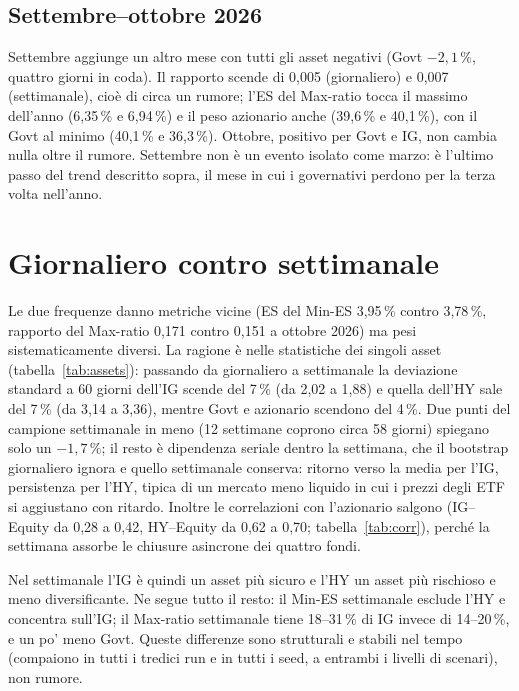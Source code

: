 \documentclass[11pt,a4paper]{article}
\begin{document}
\subsection{Settembre--ottobre 2026}

Settembre aggiunge un altro mese con tutti gli asset negativi (Govt $-2{,}1\,\%$, quattro giorni in coda). Il rapporto scende di 0,005 (giornaliero) e 0,007 (settimanale), cio\`e di circa un rumore; l'ES del Max-ratio tocca il massimo dell'anno (6,35\,\% e 6,94\,\%) e il peso azionario anche (39,6\,\% e 40,1\,\%), con il Govt al minimo (40,1\,\% e 36,3\,\%). Ottobre, positivo per Govt e IG, non cambia nulla oltre il rumore. Settembre non \`e un evento isolato come marzo: \`e l'ultimo passo del trend descritto sopra, il mese in cui i governativi perdono per la terza volta nell'anno.

\section{Giornaliero contro settimanale}

Le due frequenze danno metriche vicine (ES del Min-ES 3,95\,\% contro 3,78\,\%, rapporto del Max-ratio 0,171 contro 0,151 a ottobre 2026) ma pesi sistematicamente diversi. La ragione \`e nelle statistiche dei singoli asset (tabella~\ref{tab:assets}): passando da giornaliero a settimanale la deviazione standard a 60 giorni dell'IG scende del 7\,\% (da 2,02 a 1,88) e quella dell'HY sale del 7\,\% (da 3,14 a 3,36), mentre Govt e azionario scendono del 4\,\%. Due punti del campione settimanale in meno (12 settimane coprono circa 58 giorni) spiegano solo un $-1{,}7\,\%$; il resto \`e dipendenza seriale dentro la settimana, che il bootstrap giornaliero ignora e quello settimanale conserva: ritorno verso la media per l'IG, persistenza per l'HY, tipica di un mercato meno liquido in cui i prezzi degli ETF si aggiustano con ritardo. Inoltre le correlazioni con l'azionario salgono (IG--Equity da 0,28 a 0,42, HY--Equity da 0,62 a 0,70; tabella~\ref{tab:corr}), perch\'e la settimana assorbe le chiusure asincrone dei quattro fondi.

Nel settimanale l'IG \`e quindi un asset pi\`u sicuro e l'HY un asset pi\`u rischioso e meno diversificante. Ne segue tutto il resto: il Min-ES settimanale esclude l'HY e concentra sull'IG; il Max-ratio settimanale tiene 18--31\,\% di IG invece di 14--20\,\%, e un po' meno Govt. Queste differenze sono strutturali e stabili nel tempo (compaiono in tutti i tredici run e in tutti i seed, a entrambi i livelli di scenari), non rumore.
\end{document}
